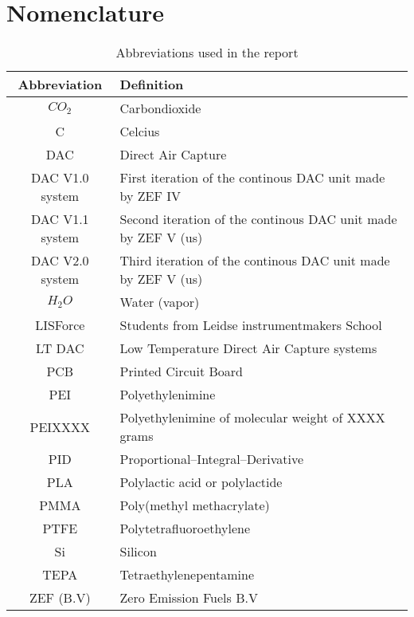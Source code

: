 \section{Nomenclature}

\begin{table}[H]
    \centering
    \begin{tabular}{c|l}
        Abbreviation & Definition  \\
        \hline 
        \hline
         $CO_2$ & Carbondioxide\\
         C & Celcius \\
    DAC  & Direct Air Capture\\
    DAC V1.0 system & First iteration of the continous DAC unit made by ZEF IV\\
    DAC V1.1 system  & Second iteration of the continous DAC unit made by ZEF V (us)\\
    DAC V2.0 system  & Third iteration of the continous DAC unit made by ZEF V (us)\\
    $H_{2}O$ & Water (vapor)\\
    LISForce & Students from Leidse instrumentmakers School\\
    LT DAC & Low Temperature Direct Air Capture systems\\
    PCB  & Printed Circuit Board\\
    PEI  & Polyethylenimine\\
    PEIXXXX & Polyethylenimine of molecular weight of XXXX grams\\
    PID & Proportional–Integral–Derivative\\
    PLA  & Polylactic acid or polylactide\\
    PMMA  & Poly(methyl methacrylate)\\
    PTFE & Polytetrafluoroethylene \\
    Si & Silicon \\
    TEPA  & Tetraethylenepentamine\\
    ZEF (B.V) & Zero Emission Fuels B.V  \\
 
    \end{tabular}
    \caption{Abbreviations used in the report}
    \label{tab:nom}
\end{table}